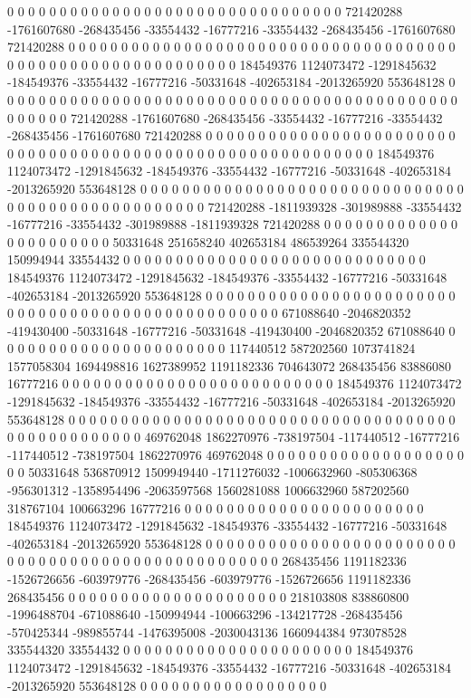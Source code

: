 0 0 0 0 0 0 0 0 0 0 0 0 0 0 0 0 0 0 0 0 0 0 0 0 0 0 0 0 0 0 0 0 721420288 -1761607680 -268435456 -33554432 -16777216 -33554432 -268435456 -1761607680 721420288 0 0 0 0 0 0 0 0 0 0 0 0 0 0 0 0 0 0 0 0 0 0 0 0 0 0 0 0 0 0 0 0 0 0 0 0 0 0 0 0 0 0 0 0 0 0 0 0 0 0 0 0 0 0 0 0 0 0 0 184549376 1124073472 -1291845632 -184549376 -33554432 -16777216 -50331648 -402653184 -2013265920 553648128 0 0 0 0 0 0 0 0 0 0 0 0 0 0 0 0 0 0
0 0 0 0 0 0 0 0 0 0 0 0 0 0 0 0 0 0 0 0 0 0 0 0 0 0 0 0 0 0 0 0 721420288 -1761607680 -268435456 -33554432 -16777216 -33554432 -268435456 -1761607680 721420288 0 0 0 0 0 0 0 0 0 0 0 0 0 0 0 0 0 0 0 0 0 0 0 0 0 0 0 0 0 0 0 0 0 0 0 0 0 0 0 0 0 0 0 0 0 0 0 0 0 0 0 0 0 0 0 0 0 0 0 184549376 1124073472 -1291845632 -184549376 -33554432 -16777216 -50331648 -402653184 -2013265920 553648128 0 0 0 0 0 0 0 0 0 0 0 0 0 0 0 0 0 0
0 0 0 0 0 0 0 0 0 0 0 0 0 0 0 0 0 0 0 0 0 0 0 0 0 0 0 0 0 0 0 0 721420288 -1811939328 -301989888 -33554432 -16777216 -33554432 -301989888 -1811939328 721420288 0 0 0 0 0 0 0 0 0 0 0 0 0 0 0 0 0 0 0 0 0 0 0 50331648 251658240 402653184 486539264 335544320 150994944 33554432 0 0 0 0 0 0 0 0 0 0 0 0 0 0 0 0 0 0 0 0 0 0 0 0 0 0 0 0 0 184549376 1124073472 -1291845632 -184549376 -33554432 -16777216 -50331648 -402653184 -2013265920 553648128 0 0 0 0 0 0 0 0 0 0 0 0 0 0 0 0 0 0
0 0 0 0 0 0 0 0 0 0 0 0 0 0 0 0 0 0 0 0 0 0 0 0 0 0 0 0 0 0 0 0 671088640 -2046820352 -419430400 -50331648 -16777216 -50331648 -419430400 -2046820352 671088640 0 0 0 0 0 0 0 0 0 0 0 0 0 0 0 0 0 0 0 0 0 0 117440512 587202560 1073741824 1577058304 1694498816 1627389952 1191182336 704643072 268435456 83886080 16777216 0 0 0 0 0 0 0 0 0 0 0 0 0 0 0 0 0 0 0 0 0 0 0 0 0 0 184549376 1124073472 -1291845632 -184549376 -33554432 -16777216 -50331648 -402653184 -2013265920 553648128 0 0 0 0 0 0 0 0 0 0 0 0 0 0 0 0 0 0
0 0 0 0 0 0 0 0 0 0 0 0 0 0 0 0 0 0 0 0 0 0 0 0 0 0 0 0 0 0 0 0 469762048 1862270976 -738197504 -117440512 -16777216 -117440512 -738197504 1862270976 469762048 0 0 0 0 0 0 0 0 0 0 0 0 0 0 0 0 0 0 0 0 0 50331648 536870912 1509949440 -1711276032 -1006632960 -805306368 -956301312 -1358954496 -2063597568 1560281088 1006632960 587202560 318767104 100663296 16777216 0 0 0 0 0 0 0 0 0 0 0 0 0 0 0 0 0 0 0 0 0 0 0 184549376 1124073472 -1291845632 -184549376 -33554432 -16777216 -50331648 -402653184 -2013265920 553648128 0 0 0 0 0 0 0 0 0 0 0 0 0 0 0 0 0 0
0 0 0 0 0 0 0 0 0 0 0 0 0 0 0 0 0 0 0 0 0 0 0 0 0 0 0 0 0 0 0 0 268435456 1191182336 -1526726656 -603979776 -268435456 -603979776 -1526726656 1191182336 268435456 0 0 0 0 0 0 0 0 0 0 0 0 0 0 0 0 0 0 0 0 0 218103808 838860800 -1996488704 -671088640 -150994944 -100663296 -134217728 -268435456 -570425344 -989855744 -1476395008 -2030043136 1660944384 973078528 335544320 33554432 0 0 0 0 0 0 0 0 0 0 0 0 0 0 0 0 0 0 0 0 0 0 184549376 1124073472 -1291845632 -184549376 -33554432 -16777216 -50331648 -402653184 -2013265920 553648128 0 0 0 0 0 0 0 0 0 0 0 0 0 0 0 0 0 0
